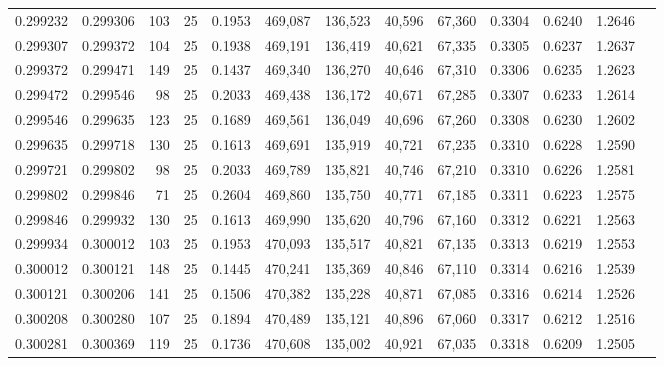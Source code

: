 \begin{tabular}{rrrrrrrrrrrrr}
0.299232 & 0.299306 &   103 &  25 &                                     0.1953 & 469,087 & 136,523 &  40,596 &  67,360 & 0.3304 & 0.6240 & 1.2646 \\
0.299307 & 0.299372 &   104 &  25 &                                     0.1938 & 469,191 & 136,419 &  40,621 &  67,335 & 0.3305 & 0.6237 & 1.2637 \\
0.299372 & 0.299471 &   149 &  25 &                                     0.1437 & 469,340 & 136,270 &  40,646 &  67,310 & 0.3306 & 0.6235 & 1.2623 \\
0.299472 & 0.299546 &    98 &  25 &                                     0.2033 & 469,438 & 136,172 &  40,671 &  67,285 & 0.3307 & 0.6233 & 1.2614 \\
0.299546 & 0.299635 &   123 &  25 &                                     0.1689 & 469,561 & 136,049 &  40,696 &  67,260 & 0.3308 & 0.6230 & 1.2602 \\
0.299635 & 0.299718 &   130 &  25 &                                     0.1613 & 469,691 & 135,919 &  40,721 &  67,235 & 0.3310 & 0.6228 & 1.2590 \\
0.299721 & 0.299802 &    98 &  25 &                                     0.2033 & 469,789 & 135,821 &  40,746 &  67,210 & 0.3310 & 0.6226 & 1.2581 \\
0.299802 & 0.299846 &    71 &  25 &                                     0.2604 & 469,860 & 135,750 &  40,771 &  67,185 & 0.3311 & 0.6223 & 1.2575 \\
0.299846 & 0.299932 &   130 &  25 &                                     0.1613 & 469,990 & 135,620 &  40,796 &  67,160 & 0.3312 & 0.6221 & 1.2563 \\
0.299934 & 0.300012 &   103 &  25 &                                     0.1953 & 470,093 & 135,517 &  40,821 &  67,135 & 0.3313 & 0.6219 & 1.2553 \\
0.300012 & 0.300121 &   148 &  25 &                                     0.1445 & 470,241 & 135,369 &  40,846 &  67,110 & 0.3314 & 0.6216 & 1.2539 \\
0.300121 & 0.300206 &   141 &  25 &                                     0.1506 & 470,382 & 135,228 &  40,871 &  67,085 & 0.3316 & 0.6214 & 1.2526 \\
0.300208 & 0.300280 &   107 &  25 &                                     0.1894 & 470,489 & 135,121 &  40,896 &  67,060 & 0.3317 & 0.6212 & 1.2516 \\
0.300281 & 0.300369 &   119 &  25 &                                     0.1736 & 470,608 & 135,002 &  40,921 &  67,035 & 0.3318 & 0.6209 & 1.2505 \\

\end{tabular}
